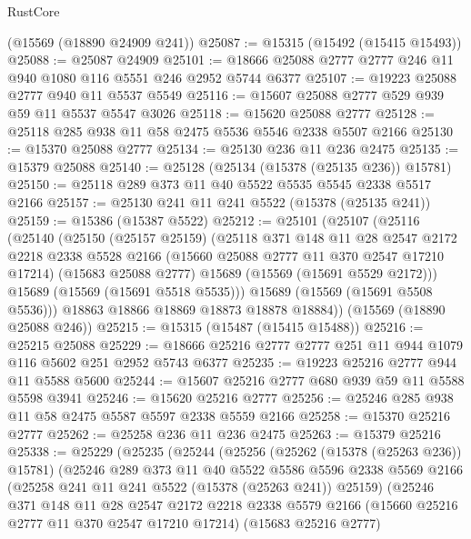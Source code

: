 \begin{lexlean}{RustCore}
\begin{coremodule}
    (@15569 (@18890 @24909 @241))
@25087 := @15315 (@15492 (@15415 @15493))
@25088 := @25087 @24909
@25101 := @18666 @25088 @2777 @2777 @246 @11 @940 @1080 @116 @5551 @246 @2952 @5744 @6377
@25107 := @19223 @25088 @2777 @940 @11 @5537 @5549
@25116 := @15607 @25088 @2777 @529 @939 @59 @11 @5537 @5547 @3026
@25118 := @15620 @25088 @2777
@25128 := @25118 @285 @938 @11 @58 @2475 @5536 @5546 @2338 @5507 @2166
@25130 := @15370 @25088 @2777
@25134 := @25130 @236 @11 @236 @2475
@25135 := @15379 @25088
@25140 := @25128 (@25134 (@15378 (@25135 @236)) @15781)
@25150 := @25118 @289 @373 @11 @40 @5522 @5535 @5545 @2338 @5517 @2166
@25157 := @25130 @241 @11 @241 @5522 (@15378 (@25135 @241))
@25159 := @15386 (@15387 @5522)
@25212 := @25101
    (@25107
      (@25116
        (@25140
          (@25150
            (@25157 @25159)
            (@25118
              @371
              @148
              @11
              @28
              @2547
              @2172
              @2218
              @2338
              @5528
              @2166
              (@15660 @25088 @2777 @11 @370 @2547 @17210 @17214)
              (@15683 @25088 @2777)
              @15689
              (@15569 (@15691 @5529 @2172)))
            @15689
            (@15569 (@15691 @5518 @5535)))
          @15689
          (@15569 (@15691 @5508 @5536)))
        @18863
        @18866
        @18869
        @18873
        @18878
        @18884))
    (@15569 (@18890 @25088 @246))
@25215 := @15315 (@15487 (@15415 @15488))
@25216 := @25215 @25088
@25229 := @18666 @25216 @2777 @2777 @251 @11 @944 @1079 @116 @5602 @251 @2952 @5743 @6377
@25235 := @19223 @25216 @2777 @944 @11 @5588 @5600
@25244 := @15607 @25216 @2777 @680 @939 @59 @11 @5588 @5598 @3941
@25246 := @15620 @25216 @2777
@25256 := @25246 @285 @938 @11 @58 @2475 @5587 @5597 @2338 @5559 @2166
@25258 := @15370 @25216 @2777
@25262 := @25258 @236 @11 @236 @2475
@25263 := @15379 @25216
@25338 := @25229
    (@25235
      (@25244
        (@25256
          (@25262 (@15378 (@25263 @236)) @15781)
          (@25246
            @289
            @373
            @11
            @40
            @5522
            @5586
            @5596
            @2338
            @5569
            @2166
            (@25258 @241 @11 @241 @5522 (@15378 (@25263 @241)) @25159)
            (@25246
              @371
              @148
              @11
              @28
              @2547
              @2172
              @2218
              @2338
              @5579
              @2166
              (@15660 @25216 @2777 @11 @370 @2547 @17210 @17214)
              (@15683 @25216 @2777)

\end{coremodule}
\end{lexlean}
